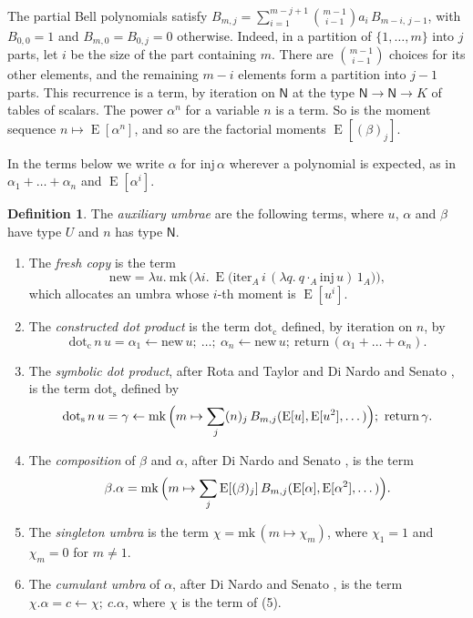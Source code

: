 \documentclass[11pt,a4paper]{report}
\theoremstyle{plain}
\theoremstyle{definition}
\newtheorem{definition}[theorem]{Definition}
\theoremstyle{remark}
\newcommand{\E}{\operatorname{E}}
\newcommand{\Nat}{\mathsf{N}}
\newcommand{\mk}{\mathrm{mk}}
\begin{document}
The partial Bell polynomials satisfy
$B_{m,j} = \sum_{i=1}^{m-j+1} \binom{m-1}{i-1} a_i\, B_{m-i,\,j-1}$, with
$B_{0,0} = 1$ and $B_{m,0} = B_{0,j} = 0$ otherwise. Indeed, in a partition of
$\{1, \dots, m\}$ into $j$ parts, let $i$ be the size of the part containing
$m$. There are $\binom{m-1}{i-1}$ choices for its other elements, and the
remaining $m - i$ elements form a partition into $j - 1$ parts. This recurrence
is a term, by iteration on $\Nat$ at the type $\Nat \to \Nat \to K$ of tables of
scalars. The power $\alpha^n$ for a variable $n$ is a term. So is the moment
sequence $n \mapsto \E[\alpha^n]$, and so are the factorial moments
$\E[(\beta)_j]$.

In the terms below we write $\alpha$ for $\mathrm{inj}\,\alpha$ wherever a
polynomial is expected, as in $\alpha_1 + \dots + \alpha_n$ and $\E[\alpha^i]$.

\begin{definition}
\label{def:auxiliary}
The \emph{auxiliary umbrae} are the following terms, where $u$, $\alpha$ and
$\beta$ have type $U$ and $n$ has type $\Nat$.
\begin{enumerate}
\item The \emph{fresh copy} is the term
  \[
    \mathrm{new} = \lambda u.\ \mk\,\bigl(\lambda i.\ \E\bigl(\mathrm{iter}_A\, i\,
      (\lambda q.\ q \cdot_A \mathrm{inj}\, u)\, 1_A\bigr)\bigr) ,
  \]
  which allocates an umbra whose $i$-th moment is $\E[u^i]$.
\item The \emph{constructed dot product} is the term $\mathrm{dot}_{\mathrm{c}}$
  defined, by iteration on $n$, by
  \[
    \mathrm{dot}_{\mathrm{c}}\, n\, u = \alpha_1 \leftarrow \mathrm{new}\, u;\ \dots;\
    \alpha_n \leftarrow \mathrm{new}\, u;\
    \mathrm{return}\,(\alpha_1 + \dots + \alpha_n) .
  \]
\item The \emph{symbolic dot product}, after Rota and Taylor
  \cite{RotaTaylor1994} and Di Nardo and Senato \cite[\S2.2]{DiNardoSenato2001},
  is the term $\mathrm{dot}_{\mathrm{s}}$ defined by
  \[
    \mathrm{dot}_{\mathrm{s}}\, n\, u = \gamma \leftarrow \mk\,\Bigl(m \mapsto
    \sum_{j} (n)_j\, B_{m,j}(\E[u], \E[u^2], \dots)\Bigr);\ \mathrm{return}\,\gamma .
  \]
\item The \emph{composition} of $\beta$ and $\alpha$, after Di Nardo and Senato
  \cite[\S2.2]{DiNardoSenato2001}, is the term
  \[
    \beta.\alpha = \mk\,\Bigl(m \mapsto \sum_j \E[(\beta)_j]\, B_{m,j}(\E[\alpha],
    \E[\alpha^2], \dots)\Bigr) .
  \]
\item The \emph{singleton umbra} is the term $\chi = \mk\,(m \mapsto \chi_m)$,
  where $\chi_1 = 1$ and $\chi_m = 0$ for $m \neq 1$.
\item The \emph{cumulant umbra} of $\alpha$, after Di Nardo and Senato
  \cite{DiNardoSenato2006}, is the term $\chi.\alpha = c \leftarrow \chi;\ c.\alpha$,
  where $\chi$ is the term of (5).
\end{enumerate}
\end{definition}
\end{document}
